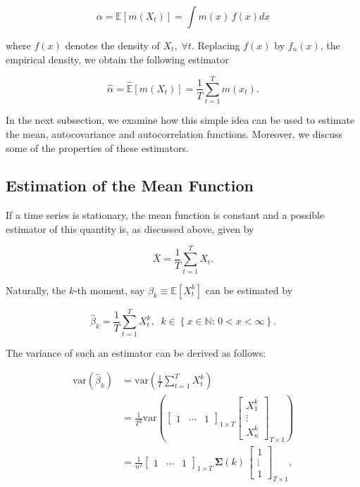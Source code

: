 \documentclass[]{book}
\theoremstyle{definition}
\theoremstyle{definition}
\theoremstyle{definition}
\theoremstyle{remark}
\begin{document}
\[\alpha = \mathbb{E}[m(X_t) ] = \int m(x) \, f(x) dx\]

where \(f(x)\) denotes the density of \(X_t, \; \forall t\). Replacing
\(f(x)\) by \(f_n(x)\), the empirical density, we obtain the following
estimator

\[\hat{\alpha} = \widehat{\mathbb{E}}[m(X_t) ] = \frac{1}{T} \sum_{t = 1}^T m\left(x_t\right).\]

In the next subsection, we examine how this simple idea can be used to
estimate the mean, autocovariance and autocorrelation functions.
Moreover, we discuss some of the properties of these estimators.

\hypertarget{estimation-of-the-mean-function}{%
\subsection{Estimation of the Mean
Function}\label{estimation-of-the-mean-function}}

If a time series is stationary, the mean function is constant and a
possible estimator of this quantity is, as discussed above, given by

\[\bar{X} = {\frac{1}{T}\sum\limits_{t = 1}^T {{X_t}} }.\]

Naturally, the \(k\)-th moment, say \(\beta_k \equiv \mathbb{E}[X_t^k]\)
can be estimated by

\[\hat{\beta}_k = {\frac{1}{T}\sum\limits_{t = 1}^T {{X_t^k}} }, \;\; k \in \left\{x \in \mathbb{N} : \, 0 < x < \infty  \right\}.\]

The variance of such an estimator can be derived as follows:

\begin{equation}
  \begin{aligned}
  \text{var} \left( \hat{\beta}_k \right) &= \text{var} \left( {\frac{1}{T}\sum\limits_{t = 1}^T {{X_t^k}} } \right)  \\
  &= \frac{1}{{{T^2}}}\text{var} \left( {{{\left[ {\begin{array}{*{20}{c}}
    1& \cdots &1
    \end{array}} \right]}_{1 \times T}}{{\left[ {\begin{array}{*{20}{c}}
      {{X_1^k}} \\
      \vdots  \\
      {{X_n^k}}
      \end{array}} \right]}_{T \times 1}}} \right)  \\
  &= \frac{1}{{{n^2}}}{\left[ {\begin{array}{*{20}{c}}
    1& \cdots &1
    \end{array}} \right]_{1 \times T}} \, \boldsymbol{\Sigma}(k) \, {\left[ {\begin{array}{*{20}{c}}
      1 \\
      \vdots  \\
      1
      \end{array}} \right]_{T \times 1}}, 
  \end{aligned}
  \label{eq:chap2VarMoment}
\end{equation}
\end{document}
